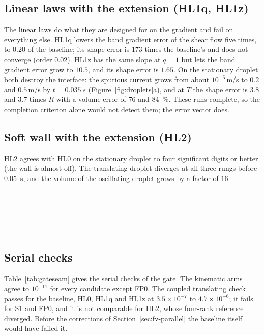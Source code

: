 \documentclass[preprint,3p,11pt]{elsarticle}
\begin{document}
\subsection{Linear laws with the extension (HL1q, HL1z)}
\label{sec:res-hl1}
The linear laws do what they are designed for on the gradient and fail on everything
else. HL1q lowers the band gradient error of the shear flow five times, to $0.20$ of the
baseline; its shape error is $173$ times the baseline's and does not converge (order
$0.02$). HL1z has the same slope at $q=1$ but lets the band gradient error grow to
$10.5$, and its shape error is $1.65$. On the stationary droplet both destroy the
interface: the spurious current grows from about $10^{-6}$\,m/s to $0.2$ and
$0.5$\,m/s by $t=\SI{0.035}{s}$ (Figure~\ref{fig:droplets}a), and at $T$ the shape error is $3.8$ and
$3.7$ times $R$ with a volume error of $76$ and \SI{84}{\percent}. These runs complete,
so the completion criterion alone would not detect them; the error vector does.

\subsection{Soft wall with the extension (HL2)}
HL2 agrees with HL0 on the stationary droplet to four significant digits or better (the
wall is almost off). The translating droplet diverges at all three rungs before
\SI{0.05}{s}, and the volume of the oscillating droplet grows by a factor of $16$.

\begin{table}[p]
  \centering
  \caption{The shear arm: the value at the finest rung ($N=136$) and the least-squares
  order of each entry.}
  \label{tab:arm-shear}
  \small
  \resizebox{\textwidth}{!}{}\\[10pt]
  \caption{The stationary arm ($N=200$).}
  \label{tab:arm-stat}
  \resizebox{\textwidth}{!}{}\\[10pt]
  \caption{The translating arm ($N=200$).}
  \label{tab:arm-trans}
  \resizebox{\textwidth}{!}{}\\[10pt]
  \caption{The oscillating arm ($N=200$).}
  \label{tab:arm-osc}
  \resizebox{\textwidth}{!}{}
\end{table}

\subsection{Serial checks}
Table~\ref{tab:gateseam} gives the serial checks of the gate. The kinematic arms agree to
$10^{-11}$ for every candidate except FP0. The coupled translating check passes for the
baseline, HL0, HL1q and HL1z at $3.5\times10^{-7}$ to $4.7\times10^{-6}$; it fails for S1
and FP0, and it is not comparable for HL2, whose four-rank reference diverged. Before the
corrections of Section~\ref{sec:fv-parallel} the baseline itself would have failed it.
\end{document}
